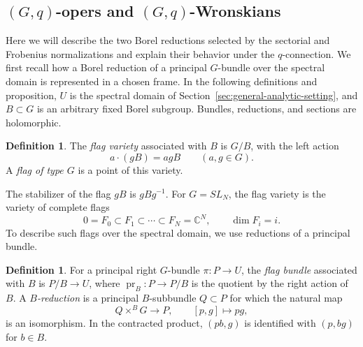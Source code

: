 \documentclass[11pt,leqno]{amsart}
\numberwithin{equation}{section}
\theoremstyle{plain}
\theoremstyle{definition}
\newtheorem{definition}[theorem]{Definition}
\theoremstyle{plain}
\theoremstyle{definition}
\theoremstyle{remark}
\begin{document}
\subsection{\texorpdfstring{$(G,q)$}{(G,q)}-opers and \texorpdfstring{$(G,q)$}{(G,q)}-Wronskians}\label{sec:differential-Wronskian-transport}
Here we will describe the two Borel reductions selected by the sectorial and Frobenius normalizations and explain their behavior under the $q$-connection. We first recall how a Borel reduction of a principal $G$-bundle over the spectral domain is represented in a chosen frame.
In the following definitions and proposition, $U$ is the spectral domain of Section~\ref{sec:general-analytic-setting}, and $B\subset G$ is an arbitrary fixed Borel subgroup.  Bundles, reductions, and sections are holomorphic.

\begin{definition}\label{def:G-flag}
The \emph{flag variety} associated with $B$ is $G/B$, with the left action
\[
 a\cdot(gB)=agB\qquad(a,g\in G).
\]
A \emph{flag of type $G$} is a point of this variety.
\end{definition}

The stabilizer of the flag $gB$ is $gBg^{-1}$.  For $G=SL_N$, the flag variety is the variety of complete flags
\[
 0=F_0\subset F_1\subset\cdots\subset F_N=\mathbb C^N,
 \qquad \dim F_i=i.
\]
To describe such flags over the spectral domain, we use reductions of a principal bundle.

\begin{definition}\label{def:Borel-reduction}
For a principal right $G$-bundle $\pi:P\to U$, the \emph{flag bundle} associated with $B$ is $P/B\to U$, where $\operatorname{pr}_{B}:P\to P/B$ is the quotient by the right action of $B$.  A \emph{$B$-reduction} is a principal $B$-subbundle $Q\subset P$ for which the natural map
\[
 Q\times^{B}G\longrightarrow P,\qquad [p,g]\longmapsto pg,
\]
is an isomorphism.  In the contracted product, $(pb,g)$ is identified with $(p,bg)$ for $b\in B$.
\end{definition}
\end{document}
